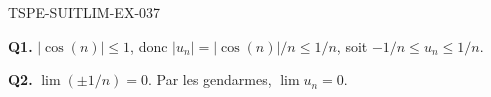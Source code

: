 \begin{corrige}{TSPE-SUITLIM-EX-037}

\textbf{Q1.} $|\cos(n)| \leq 1$, donc $|u_n| = |\cos(n)|/n \leq 1/n$, soit $-1/n \leq u_n \leq 1/n$.

\textbf{Q2.} $\lim(\pm 1/n) = 0$. Par les gendarmes, $\boxed{\lim u_n = 0}$.

\end{corrige}
